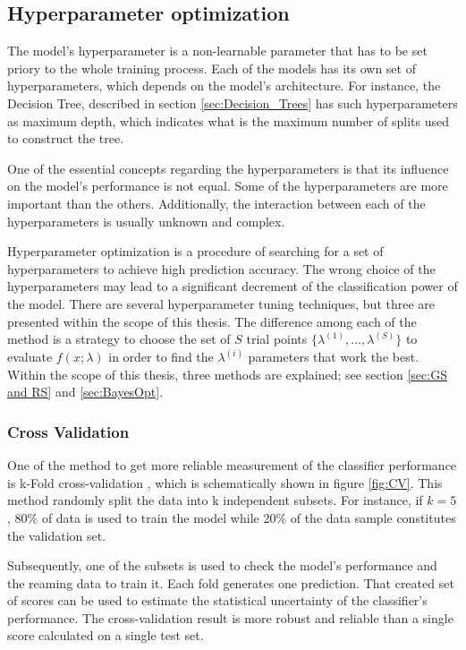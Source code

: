 \subsection{Hyperparameter optimization}
\label{sec:hyperparameters}

The model's hyperparameter is a non-learnable parameter that has to be set priory to the whole training process. Each of the models has its own set of hyperparameters, which depends on the model's architecture. For instance, the Decision Tree, described in section \ref{sec:Decision_Trees} has such hyperparameters as maximum depth, which indicates what is the maximum number of splits used to construct the tree. 

One of the essential concepts regarding the hyperparameters is that its influence on the model's performance is not equal. Some of the hyperparameters are more important than the others. Additionally, the interaction between each of the hyperparameters is usually unknown and complex. 

Hyperparameter optimization is a procedure of searching for a set of hyperparameters to achieve high prediction accuracy. The wrong choice of the hyperparameters may lead to a significant decrement of the classification power of the model. There are several hyperparameter tuning techniques, but three are presented within the scope of this thesis. The difference among each of the method is a strategy to choose the set of $S$ trial points $\{\lambda^{(1)}, \ldots , \lambda^{(S)} \}$ to evaluate $f(x;\lambda)$ in order to find the $\lambda^{(i)}$ parameters that work the best. Within the scope of this thesis, three methods are explained; see section \ref{sec:GS and RS} and \ref{sec:BayesOpt}.  

\subsubsection{Cross Validation}
One of the method to get more reliable measurement of the classifier performance is k-Fold cross-validation \cite{Statistical_Methods}, which is schematically shown in figure \ref{fig:CV}. 
This method randomly split the data into k independent subsets. For instance, if $k = 5$, 80\% of data is used to train the model while 20\% of the data sample constitutes the validation set.   

Subsequently, one of the subsets is used to check the model's performance and the reaming data to train it. Each fold generates one prediction. That created set of scores can be used to estimate the statistical uncertainty of the classifier's performance. The cross-validation result is more robust and reliable than a single score calculated on a single test set.   


